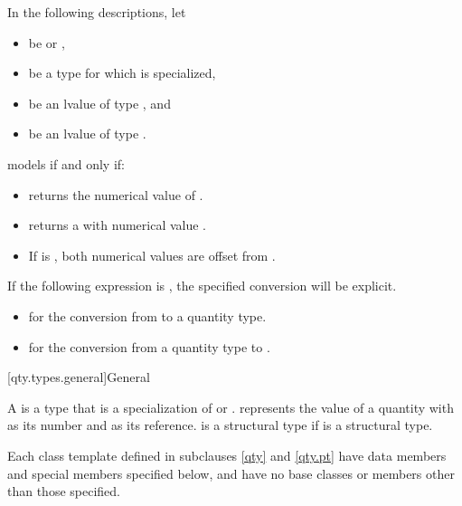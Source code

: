 \pnum
In the following descriptions, let
\begin{itemize}
\item
{} be  or ,
\item
{} be a type for which  is specialized,
\item
{} be an lvalue of type , and
\item
{} be an lvalue of type .
\end{itemize}

\pnum
{} models  if and only if:
\begin{itemize}
\item
{} returns the numerical value of .
\item
{} returns a  with numerical value .
\item
If  is ,
both numerical values are offset from .
\end{itemize}

\pnum
If the following expression is , the specified conversion will be explicit.
\begin{itemize}
\item
{} for the conversion from  to a quantity type.
\item
{} for the conversion from a quantity type to .
\end{itemize}

[qty.types.general]{General}

\pnum
\label{term.quantity.type}
A 
is a type 
that is a specialization of  or .
 represents the value of a quantity
with  as its number
and  as its reference.
 is a structural type
if  is a structural type.

\pnum
Each class template defined in subclauses \ref{qty} and \ref{qty.pt}
have data members and special members specified below, and
have no base classes or members other than those specified.

